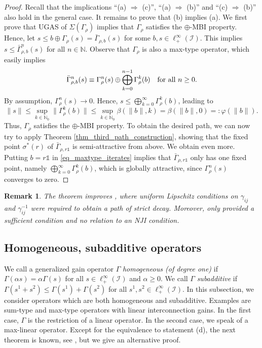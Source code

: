\documentclass[10pt, oneside, a4paper]{article}
\newcommand{\N}{\mathbb{N}}
\newcommand{\unit}{\mathds{1}}
\newcommand{\IC}{\mathcal{I}}
\newcommand{\bsign}[1]{\bar{#1}}
\newtheorem{remark}{Remark}[section]
\begin{document}
\begin{proof}
Recall that the implications ``(a) $\Rightarrow$ (c)'', ``(a) $\Rightarrow$ (b)'' and ``(c) $\Rightarrow$ (b)'' also hold in the general case. It remains to prove that (b) implies (a). We first prove that UGAS of $\Sigma(\Gamma_{\rho})$ implies that $\Gamma_{\rho}$ satisfies the $\oplus$-MBI property. Hence, let $s \leq b \oplus \Gamma_{\rho}(s) = \bsign{\Gamma}_{\rho,b}(s)$ for some $b,s \in \ell^{\infty}_+(\IC)$. This implies $s \leq \bsign{\Gamma}_{\rho,b}^n(s)$ for all $n \in \N$. Observe that $\Gamma_{\rho}$ is also a max-type operator, which easily implies%
\begin{equation}\label{eq_maxtype_iterates}
  \bsign{\Gamma}_{\rho,b}^n(s) \equiv \Gamma_{\rho}^n(s) \oplus \bigoplus_{k=0}^{n-1} \Gamma^k_{\rho}(b) \mbox{\quad for all\ } n \geq 0.%
\end{equation}
By assumption, $\Gamma_{\rho}^n(s) \rightarrow 0$. Hence, $s \leq \bigoplus_{k=0}^{\infty} \Gamma^k_{\rho}(b)$, leading to%
\begin{equation*}
  \|s\| \leq \sup_{k \in \N_0} \|\Gamma^k_{\rho}(b)\| \leq \sup_{k\in\N_0} \beta(\|b\|,k) = \beta(\|b\|,0) =: \varphi(\|b\|).%
\end{equation*}
Thus, $\Gamma_{\rho}$ satisfies the $\oplus$-MBI property. To obtain the desired path, we can now try to apply Theorem \ref{thm_third_path_construction}, showing that the fixed point $\sigma^*(r)$ of $\bsign{\Gamma}_{\rho,r\unit}$ is semi-attractive from above. We obtain even more. Putting $b = r\unit$ in \eqref{eq_maxtype_iterates} implies that $\bsign{\Gamma}_{\rho,r\unit}$ only has one fixed point, namely $\bigoplus_{k=0}^{\infty} \Gamma^k_{\rho}(b)$, which is globally attractive, since $\Gamma_{\rho}^n(s)$ converges to zero. 
\end{proof}

\begin{remark}
The theorem improves \cite[Thm.~VI.1]{KMZ}, where uniform Lipschitz conditions on $\gamma_{ij}$ and $\gamma_{ij}^{-1}$ were required to obtain a path of strict decay. Moreover, \cite[Thm.~VI.1]{KMZ} only provided a sufficient condition and no relation to an NJI condition.
\end{remark}

\subsection{Homogeneous, subadditive operators}\label{subsec_homogeneous}

We call a generalized gain operator $\Gamma$ \emph{homogeneous (of degree one)} if $\Gamma(\alpha s) = \alpha \Gamma(s)$ for all $s \in \ell^{\infty}_+(\IC)$ and $\alpha \geq 0$. We call $\Gamma$ \emph{subadditive} if $\Gamma(s^1 + s^2) \leq \Gamma(s^1) + \Gamma(s^2)$ for all $s^1,s^2 \in \ell^{\infty}_+(\IC)$. In this subsection, we consider operators which are both homogeneous and subadditive. Examples are sum-type and max-type operators with linear interconnection gains. In the first case, $\Gamma$ is the restriction of a linear operator. In the second case, we speak of a max-linear operator. Except for the equivalence to statement (d), the next theorem is known, see \cite[Prop.~8]{Mea}, but we give an alternative proof.%
\end{document}
